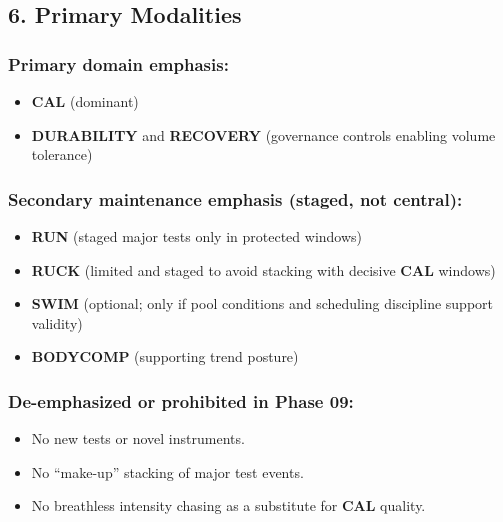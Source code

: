 \documentclass[10pt]{article}
\begin{document}
\subsection*{6. Primary Modalities}


\subsubsection*{Primary domain emphasis:}

\begin{itemize}
\item \textbf{CAL} (dominant)
\item \textbf{DURABILITY} and \textbf{RECOVERY} (governance controls enabling volume tolerance)
\end{itemize}

\subsubsection*{Secondary maintenance emphasis (staged, not central):}

\begin{itemize}
\item \textbf{RUN} (staged major tests only in protected windows)
\item \textbf{RUCK} (limited and staged to avoid stacking with decisive \textbf{CAL} windows)
\item \textbf{SWIM} (optional; only if pool conditions and scheduling discipline support validity)
\item \textbf{BODYCOMP} (supporting trend posture)
\end{itemize}

\subsubsection*{De-emphasized or prohibited in Phase 09:}

\begin{itemize}
\item No new tests or novel instruments.
\item No “make-up” stacking of major test events.
\item No breathless intensity chasing as a substitute for \textbf{CAL} quality.
\end{itemize}
\end{document}
